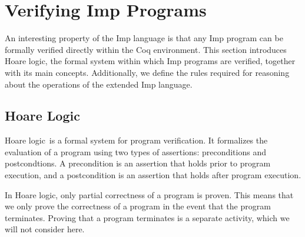 \section{Verifying Imp Programs}
An interesting property of the Imp language is that any Imp program can be formally verified directly within the Coq environment. This section introduces Hoare logic, the formal system within which Imp programs are verified, together with its main concepts. Additionally, we define the rules required for reasoning about the operations of the extended Imp language.
\subsection{Hoare Logic}
Hoare logic\,\cite{Hoare69anaxiomatic} is a formal system for program verification. It formalizes the evaluation of a program using two types of assertions: preconditions and postcondtions. A precondition is an assertion that holds prior to program execution, and a postcondition is an assertion that holds after program execution.

In Hoare logic, only partial correctness of a program is proven. This means that we only prove the correctness of a program in the event that the program terminates. Proving that a program terminates is a separate activity, which we will not consider here.
